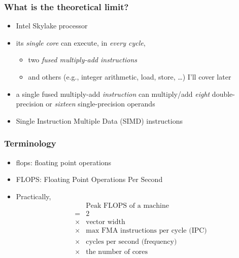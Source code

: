 \documentclass[12pt,dvipdfmx]{beamer}
\newcommand{\ao}[1]{{\color{blue}#1}}
\begin{document}
\begin{frame}
\frametitle{What is the theoretical limit?}
\begin{itemize}
\item Intel Skylake processor
\item its \ao{\it single core} can execute, in \ao{\it every cycle},
  \begin{itemize}
  \item two \ao{\it fused multiply-add instructions}
  \item and others (e.g., integer arithmetic, load, store, \ldots) 
    I'll cover later
  \end{itemize}
\item a single fused multiply-add \ao{\it instruction}
  can multiply/add \ao{\it eight} double-precision 
  or \ao{\it sixteen} single-precision operands
\item \ao{Single Instruction Multiple Data (SIMD)} instructions
\end{itemize}
\end{frame}

\begin{frame}
\frametitle{Terminology}
\begin{itemize}
\item \ao{flops:} floating point operations
\item \ao{FLOPS:} Floating Point Operations Per Second
\item Practically,
\begin{eqnarray*}
  &   & \mbox{Peak FLOPS of a machine} \\
  & = & 2 \\
  & \times & \mbox{vector width} \\
  & \times & \mbox{max FMA instructions per cycle (IPC)} \\
  & \times & \mbox{cycles per second (frequency)} \\
  & \times & \mbox{the number of cores} \\
\end{eqnarray*}
\end{itemize}
\end{frame}
\end{document}
